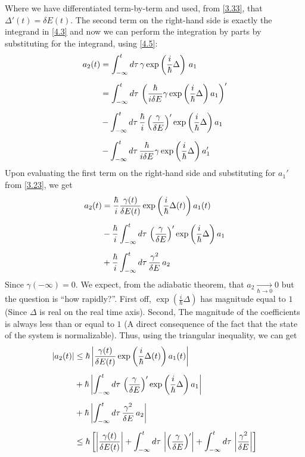 \documentclass[12pt,a4paper]{article}
\begin{document}
	Where we have differentiated term-by-term and used, from \eqref{3.33}, that $\Delta'(t) = \delta E(t)$. The second term on the right-hand side is exactly the integrand in \eqref{4.3} and now we can perform the integration by parts by substituting for the integrand, using \eqref{4.5}:
	\begin{align}
		a_{2}(t) &= \int_{-\infty}^{t} d\tau \, \gamma \exp\left( \frac{i}{\hbar} \Delta \right) \, a_{1} \notag \\[5pt]
		&= \int_{-\infty}^{t} d\tau \,\left( \dfrac{\hbar}{i \delta E} \gamma \exp\left( \dfrac{i}{\hbar} \Delta \right) a_{1} \right)' \notag \\[5pt]
		&- \int_{-\infty}^{t} d\tau \, \dfrac{\hbar}{i} \left( \dfrac{\gamma}{\delta E} \right)' \exp\left( \dfrac{i}{\hbar} \Delta \right) a_{1} \notag \\[5pt]
		&- \int_{-\infty}^{t} d\tau \, \dfrac{\hbar}{i \delta E} \gamma \exp\left( \dfrac{i}{\hbar} \Delta \right) a_{1}'
	\end{align}
	Upon evaluating the first term on the right-hand side and substituting for $a_{1}'$ from \eqref{3.23}, we get
	\begin{align}
		a_{2}(t) &= \dfrac{\hbar}{i} \dfrac{\gamma(t)}{\delta E(t)} \exp\left( \dfrac{i}{\hbar} \Delta(t) \right) a_{1}(t) \notag \\[5pt]
		&- \dfrac{\hbar}{i} \int_{-\infty}^{t} d\tau \, \left( \dfrac{\gamma}{\delta E} \right)' \exp\left( \dfrac{i}{\hbar} \Delta \right) a_{1} \notag \\[5pt]
		&+ \dfrac{\hbar}{i} \int_{-\infty}^{t} d\tau \, \dfrac{\gamma^{2}}{\delta E} \,  a_{2}  \label{4.7}
	\end{align}
	Since $\gamma(-\infty) = 0$. We expect, from the adiabatic theorem, that $a_{2} \xrightarrow[\hbar \rightarrow 0]{} 0$ but the question is \textquotedblleft how rapidly?\textquotedblright. First off, $\exp\left( \frac{i}{\hbar} \Delta \right)$ has magnitude equal to $1$ (Since $\Delta$ is real on the real time axis). Second, The magnitude of the coefficients is always less than or equal to $1$ (A direct consequence of the fact that the state of the system is normalizable). Thus, using the triangular inequality, we can get
	\begin{align}
		\left| a_{2}(t) \right| &\leq \hbar \left| \dfrac{\gamma(t)}{\delta E(t)} \exp\left( \dfrac{i}{\hbar} \Delta(t) \right) a_{1}(t) \right| \notag \\[5pt]
		&+ \hbar \left| \int_{-\infty}^{t} d\tau \, \left( \dfrac{\gamma}{\delta E} \right)' \exp\left( \dfrac{i}{\hbar} \Delta \right) a_{1} \right| \notag \\[5pt]
		&+ \hbar \left| \int_{-\infty}^{t} d\tau \, \dfrac{\gamma^{2}}{\delta E} \,  a_{2} \right| \notag \\[5pt]
		&\leq \hbar \left[ \left| \dfrac{\gamma(t)}{\delta E(t)} \right| + \int_{-\infty}^{t} d\tau \, \left| \left( \dfrac{\gamma}{\delta E} \right)' \right| + \int_{-\infty}^{t} d\tau \,  \left| \dfrac{\gamma^{2}}{\delta E} \right| \right] \label{4.8}
	\end{align}
\end{document}
